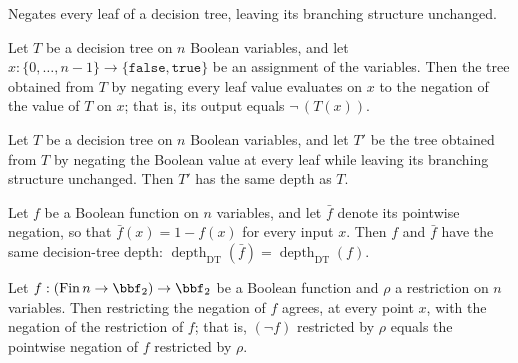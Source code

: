 \begin{definition}
\label{DecisionTree.negateLeaves}
\leanok
{}
Negates every leaf of a decision tree, leaving its branching structure unchanged.
\end{definition}

\begin{lemma}
\label{DecisionTree.negateLeaves_eval}
\leanok
{}
Let $T$ be a decision tree on $n$ Boolean variables, and let $x \colon \{0,\dots,n-1\}
\to \{\mathtt{false},\mathtt{true}\}$ be an assignment of the variables. Then the tree
obtained from $T$ by negating every leaf value evaluates on $x$ to the negation of the
value of $T$ on $x$; that is, its output equals $\lnot\,(T(x))$.
\end{lemma}

\begin{lemma}
\label{DecisionTree.negateLeaves_depth}
\leanok
{}
Let $T$ be a decision tree on $n$ Boolean variables, and let $T'$ be the tree obtained
from $T$ by negating the Boolean value at every leaf while leaving its branching
structure unchanged. Then $T'$ has the same depth as $T$.
\end{lemma}

\begin{lemma}
\label{dtDepth_neg}
\leanok
{}
Let $f$ be a Boolean function on $n$ variables, and let $\bar f$ denote its pointwise
negation, so that $\bar f(x) = 1 - f(x)$ for every input $x$. Then $f$ and $\bar f$ have
the same decision-tree depth: $\operatorname{depth}_{\mathrm{DT}}(\bar f) =
\operatorname{depth}_{\mathrm{DT}}(f)$.
\end{lemma}

\begin{lemma}
\label{SwitchingLemmaCNF.restrictFn_neg}
\leanok
{}
Let $f : (\mathrm{Fin}\,n \to \bbf_2) \to \bbf_2$ be a Boolean function and $\rho$ a
restriction on $n$ variables. Then restricting the negation of $f$ agrees, at every
point $x$, with the negation of the restriction of $f$; that is, $(\lnot f)$ restricted
by $\rho$ equals the pointwise negation of $f$ restricted by $\rho$.
\end{lemma}

